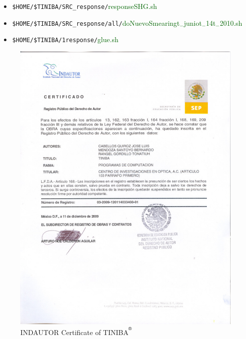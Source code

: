 \documentclass[openany,oneside]{book}
\def\reg{\textsuperscript{\textregistered}}
\numberwithin{equation}{section}
\begin{document}
\begin{enumerate}
   
\begin{itemize}
\item \verb=$HOME/$TINIBA/SRC_response/=\textcolor{darkgreen}{responseSHG.sh} 
\item \verb=$HOME/$TINIBA/SRC_response/all/=\textcolor{darkgreen}{doNuevoSmearingt$_{-}$juniot$_{-}$14t$_{-}$2010.sh} 
\item \verb=$HOME/$TINIBA/1response/=\textcolor{darkgreen}{glue.sh} 
\end{itemize}

\end{enumerate}

\begin{figure}[t]
\begin{center}
\includegraphics[scale=0.6]{CERTIFICADO-INDAUTOR-TINIBA1}
\end{center}
\caption{INDAUTOR Certificate of TINIBA$^{\reg}$ 
}
\label{inpi}
\end{figure}



\end{document}
